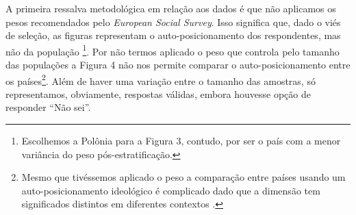 A primeira ressalva metodológica em relação aos dados é que não aplicamos os
pesos recomendados pelo \textit{European Social Survey}. Isso significa que,
dado o viés de seleção, as figuras representam o auto-posicionamento dos
respondentes, mas não da população \footnote{Escolhemos a Polônia para a Figura
  3, contudo, por ser o país com a menor variância do peso pós-estratificação.}.
Por não termos aplicado o peso que controla pelo tamanho das populações a Figura
4 não nos permite comparar o auto-posicionamento entre os países\footnote{Mesmo
  que tivéssemos aplicado o peso a comparação entre países usando um
  auto-posicionamento ideológico é complicado dado que a dimensão tem
  significados distintos em diferentes contextos \cite{laver2014measuring}. }.
Além de haver uma variação entre o tamanho das amostras, só representamos,
obviamente, respostas válidas, embora houvesse opção de responder ``Não sei''.



